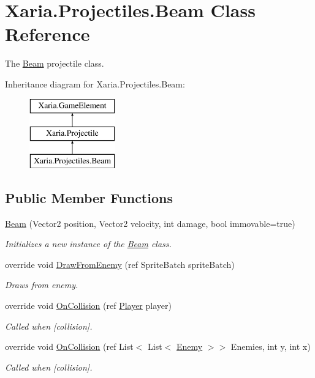 \hypertarget{classXaria_1_1Projectiles_1_1Beam}{}\section{Xaria.\+Projectiles.\+Beam Class Reference}
\label{classXaria_1_1Projectiles_1_1Beam}


The \hyperlink{classXaria_1_1Projectiles_1_1Beam}{Beam} projectile class.  


Inheritance diagram for Xaria.\+Projectiles.\+Beam\+:\begin{figure}[H]
\begin{center}
\leavevmode
\includegraphics[height=3.000000cm]{classXaria_1_1Projectiles_1_1Beam}
\end{center}
\end{figure}
\subsection*{Public Member Functions}
\begin{DoxyCompactItemize}
\item 
\hyperlink{classXaria_1_1Projectiles_1_1Beam_a02a3f0e94b3ab271eae66a8ef302e5fc}{Beam} (Vector2 position, Vector2 velocity, int damage, bool immovable=true)
\begin{DoxyCompactList}\small\item\em Initializes a new instance of the \hyperlink{classXaria_1_1Projectiles_1_1Beam}{Beam} class. \end{DoxyCompactList}\item 
override void \hyperlink{classXaria_1_1Projectiles_1_1Beam_ad7d3c0609b54569416d7be95980d2c3e}{Draw\+From\+Enemy} (ref Sprite\+Batch sprite\+Batch)
\begin{DoxyCompactList}\small\item\em Draws from enemy. \end{DoxyCompactList}\item 
override void \hyperlink{classXaria_1_1Projectiles_1_1Beam_a5c2df0bea00c89d32816f7b96ac98e65}{On\+Collision} (ref \hyperlink{classXaria_1_1Player}{Player} player)
\begin{DoxyCompactList}\small\item\em Called when \mbox{[}collision\mbox{]}. \end{DoxyCompactList}\item 
override void \hyperlink{classXaria_1_1Projectiles_1_1Beam_a48ab1c618b60104761ef1f95d040c30c}{On\+Collision} (ref List$<$ List$<$ \hyperlink{classXaria_1_1Enemy}{Enemy} $>$$>$ Enemies, int y, int x)
\begin{DoxyCompactList}\small\item\em Called when \mbox{[}collision\mbox{]}. \end{DoxyCompactList}\end{DoxyCompactItemize}
